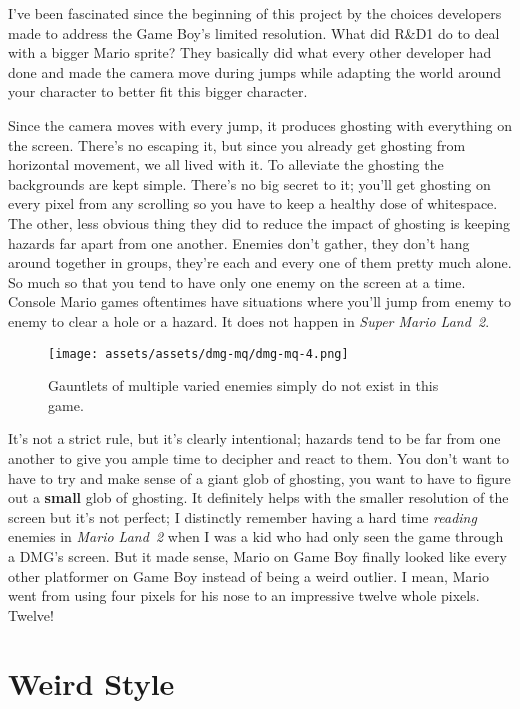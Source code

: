 \documentclass{book}
\begin{document}
I’ve been fascinated since the beginning of this project by the choices developers made to address the Game Boy’s limited resolution. What did R\&D1 do to deal with a bigger Mario sprite? They basically did what every other developer had done and made the camera move during jumps while adapting the world around your character to better fit this bigger character.

Since the camera moves with every jump, it produces ghosting with everything on the screen. There’s no escaping it, but since you already get ghosting from horizontal movement, we all lived with it. To alleviate the ghosting the backgrounds are kept simple. There’s no big secret to it; you’ll get ghosting on every pixel from any scrolling so you have to keep a healthy dose of whitespace. The other, less obvious thing they did to reduce the impact of ghosting is keeping hazards far apart from one another. Enemies don’t gather, they don’t hang around together in groups, they’re each and every one of them pretty much alone. So much so that you tend to have only one enemy on the screen at a time. Console Mario games oftentimes have situations where you’ll jump from enemy to enemy to clear a hole or a hazard. It does not happen in \emph{Super Mario Land 2}.

\begin{figure}[hbt]
\vskip 10pt
\centering \texttt{[image: assets/assets/dmg-mq/dmg-mq-4.png]}\par\pagetwodescription Gauntlets of multiple varied enemies simply do not exist in this game.
\vskip 6pt
\end{figure}

It’s not a strict rule, but it’s clearly intentional; hazards tend to be far from one another to give you ample time to decipher and react to them. You don’t want to have to try and make sense of a giant glob of ghosting, you want to have to figure out a \textbf{small} glob of ghosting. It definitely helps with the smaller resolution of the screen but it’s not perfect; I distinctly remember having a hard time \emph{reading} enemies in \emph{Mario Land 2} when I was a kid who had only seen the game through a DMG’s screen. But it made sense, Mario on Game Boy finally looked like every other platformer on Game Boy instead of being a weird outlier. I mean, Mario went from using four pixels for his nose to an impressive twelve whole pixels. Twelve!

\FloatBarrier\needspace{10mm}\section*{Weird Style}\nopagebreak[4]
\end{document}
